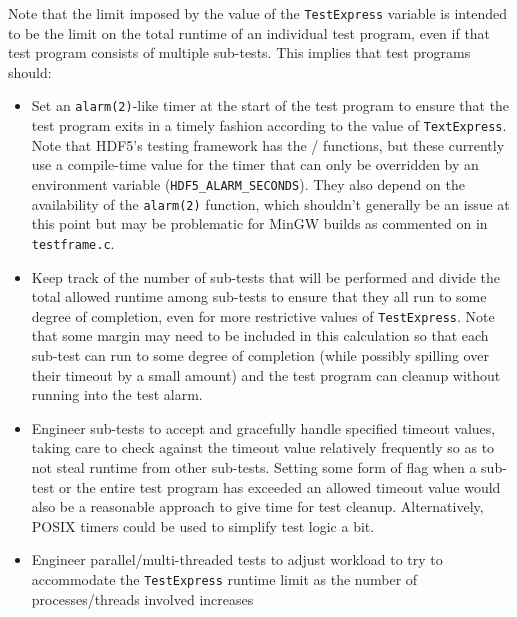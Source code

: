 \documentclass[../HDF5_RFC.tex]{subfiles}
\begin{document}
Note that the limit imposed by the value of the \texttt{TestExpress} variable is intended to be the limit
on the total runtime of an individual test program, even if that test program consists of multiple
sub-tests. This implies that test programs should:

\begin{itemize}

    \item Set an \texttt{alarm(2)}-like timer at the start of the test program to ensure that the test
          program exits in a timely fashion according to the value of \texttt{TextExpress}. Note that
          HDF5's testing framework has the  /  functions, but these currently use a compile-time value
          for the timer that can only be overridden by an environment variable
          (\texttt{HDF5\_ALARM\_SECONDS}). They also depend on the availability of the \texttt{alarm(2)} function, which shouldn't generally be an issue at this point but may be problematic for MinGW builds as commented on in \texttt{testframe.c}.
    \item Keep track of the number of sub-tests that will be performed and divide the total allowed
          runtime among sub-tests to ensure that they all run to some degree of completion, even for more
          restrictive values of \texttt{TestExpress}. Note that some margin may need to be included in
          this calculation so that each sub-test can run to some degree of completion (while possibly
          spilling over their timeout by a small amount) and the test program can cleanup without running
          into the test alarm.
    \item Engineer sub-tests to accept and gracefully handle specified timeout values, taking care to check
          against the timeout value relatively frequently so as to not steal runtime from other sub-tests.
          Setting some form of flag when a sub-test or the entire test program has exceeded an allowed
          timeout value would also be a reasonable approach to give time for test cleanup. Alternatively, POSIX timers could be used to simplify test logic a bit.
    \item Engineer parallel/multi-threaded tests to adjust workload to try to accommodate the
          \texttt{TestExpress} runtime limit as the number of processes/threads involved increases

\end{itemize}
\end{document}
